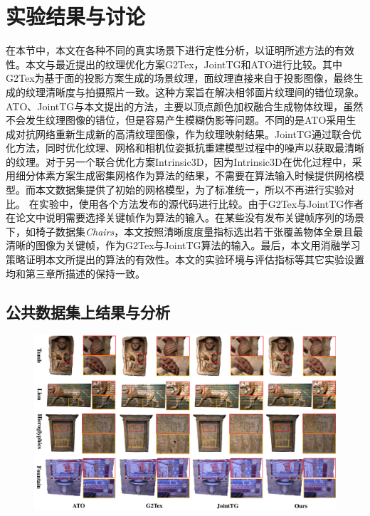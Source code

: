 \section{实验结果与讨论}
在本节中，本文在各种不同的真实场景下进行定性分析，以证明所述方法的有效性。本文与最近提出的纹理优化方案G2Tex，JointTG和ATO进行比较。其中G2Tex为基于面的投影方案生成的场景纹理，面纹理直接来自于投影图像，最终生成的纹理清晰度与拍摄照片一致。这种方案旨在解决相邻面片纹理间的错位现象。ATO、JointTG与本文提出的方法，主要以顶点颜色加权融合生成物体纹理，虽然不会发生纹理图像的错位，但是容易产生模糊伪影等问题。不同的是ATO采用生成对抗网络重新生成新的高清纹理图像，作为纹理映射结果。JointTG通过联合优化方法，同时优化纹理、网格和相机位姿抵抗重建模型过程中的噪声以获取最清晰的纹理。对于另一个联合优化方案Intrinsic3D，因为Intrinsic3D在优化过程中，采用细分体素方案生成密集网格作为算法的结果，不需要在算法输入时候提供网格模型。而本文数据集提供了初始的网格模型，为了标准统一，所以不再进行实验对比。
在实验中，使用各个方法发布的源代码进行比较。由于G2Tex与JointTG作者在论文中说明需要选择关键帧作为算法的输入。在某些没有发布关键帧序列的场景下，如椅子数据集\emph{Chairs}，本文按照清晰度度量指标选出若干张覆盖物体全景且最清晰的图像为关键帧，作为G2Tex与JointTG算法的输入。最后，本文用消融学习策略证明本文所提出的算法的有效性。本文的实验环境与评估指标等其它实验设置均和第三章所描述的保持一致。


\subsection{公共数据集上结果与分析}
\begin{figure}[!t]
\centering
\includegraphics[width=1\linewidth]{pic/work2/compare3.pdf}

\label{fig:ex2_3}
\end{figure}

